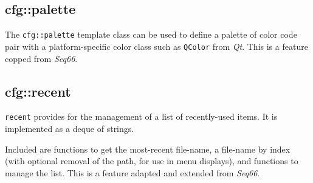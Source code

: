    \begin{verbatim}
   \end{verbatim}

\subsection{cfg::palette}
\label{subsec:cfg_namespace_}

   The \texttt{cfg::palette} template class can be used to define
   a palette of color code pair with a platform-specific color class
   such as \texttt{QColor} from \textsl{Qt}.
   This is a feature copped from \textsl{Seq66}.

\subsection{cfg::recent}
\label{subsec:cfg_namespace_recent}

   \texttt{recent} provides for the management of a list of recently-used
   items. It is implemented as a deque of strings.

   Included are functions to get the most-recent file-name, a file-name by
   index (with optional removal of the path, for use in menu displays),
   and functions to manage the list.
   This is a feature adapted and extended from \textsl{Seq66}.

